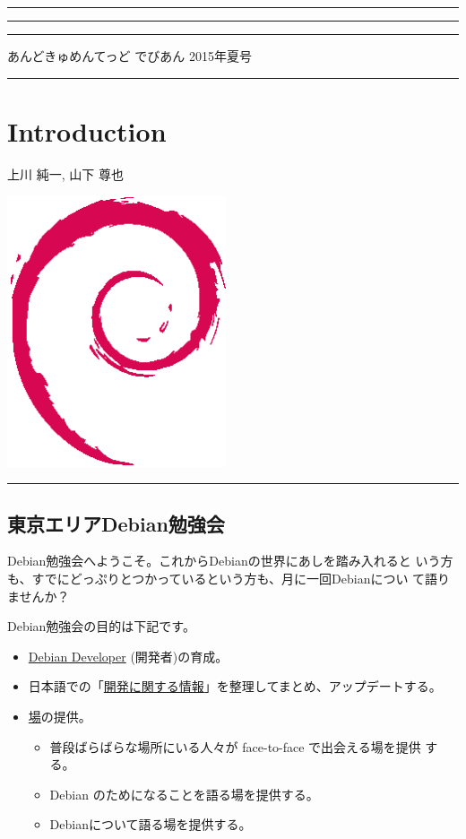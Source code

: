 \documentclass[mingoth,a4paper]{jsarticle}
\renewcommand{\dancersection}[2]{%
\newpage
あんどきゅめんてっど でびあん 2015年夏号
%
\vspace{0.1mm}\\
{\color{dancerdarkblue}\rule{\hsize}{2mm}}

%
%
\begin{minipage}[t]{0.6\hsize}
\color{dancerdarkblue}
\vspace{1cm}
\section{#1}
\hfill{}#2\\
\end{minipage}
\begin{minipage}[t]{0.4\hsize}
\vspace{-2cm}
\hfill{}\includegraphics[height=8cm]{image200502/openlogo-nd.eps}\\
\vspace{-5cm}
\end{minipage}
%
{\color{dancerlightblue}\rule{0.66\hsize}{2mm}}
%
\vspace{2cm}
}
\begin{document}
\setcounter{page}{1}
\begin{minipage}[]{0.2\hsize}
 \colorbox{dancerlightblue}{}
\end{minipage}
\begin{minipage}[]{0.8\hsize}
\hrule
\vspace{1mm}
\hrule
\setcounter{tocdepth}{1}
{\small
\begin{multicols}{2}
  \tableofcontents
\end{multicols}
} %
\vspace{1mm}
\hrule
\vspace{3cm}

\end{minipage}

\dancersection{Introduction}{上川 純一, 山下 尊也}

\subsection{東京エリアDebian勉強会}

 Debian勉強会へようこそ。これからDebianの世界にあしを踏み入れると
 いう方も、すでにどっぷりとつかっているという方も、月に一回Debianについ
 て語りませんか？

 Debian勉強会の目的は下記です。

\begin{itemize}
 \item \underline{Debian Developer} (開発者)の育成。
 \item 日本語での「\underline{開発に関する情報}」を整理してまとめ、アップデートする。
 \item \underline{場}の提供。
 \begin{itemize}
  \item 普段ばらばらな場所にいる人々が face-to-face で出会える場を提供
	する。
  \item Debian のためになることを語る場を提供する。
  \item Debianについて語る場を提供する。
 \end{itemize}
\end{itemize}
\end{document}
